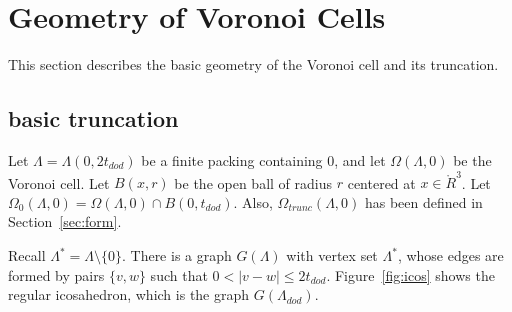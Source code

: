 \documentclass{article} %
\begin{document}


\section{Geometry of Voronoi Cells}

This section describes the basic geometry of the
 Voronoi cell and
its truncation.  

\subsection{basic truncation}\label{sec:in-ex}

Let $\Lambda = \Lambda(0,2t_{dod})$ be a finite
packing containing $0$, and let $\Omega(\Lambda,0)$ be the Voronoi cell.
Let $B(x,r)$ be the open ball of
radius $r$ centered at $x\in\ring{R}^3$.
Let $\Omega_0(\Lambda,0) = \Omega(\Lambda,0)\cap B(0,t_{dod})$.
Also, $\Omega_{trunc}(\Lambda,0)$ 
has been defined in Section~\ref{sec:form}.

Recall $\Lambda^* = \Lambda\setminus\{0\}$.  There is a graph $G(\Lambda)$
with vertex set $\Lambda^*$, whose edges are formed by pairs
$\{v,w\}$ such that $0<|v-w|\le 2t_{dod}$.  Figure~\ref{fig:icos}
shows the regular icosahedron, which is the graph $G(\Lambda_{dod})$.


\begin{floatingfigure}{30mm}
  \begin{center}
   \end{center}
  \caption{}
\label{fig:icos}
\end{floatingfigure}
\end{document}
